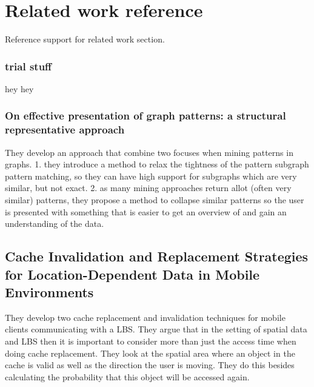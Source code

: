 \section{Related work reference}

Reference support for related work section.



\subsubsection{trial stuff}
hey hey \cite{v2}


\subsubsection{On effective presentation of graph patterns: a structural representative approach}
They develop an approach that combine two focuses when mining patterns in graphs. 1. they introduce a method to relax the tightness of the pattern subgraph pattern matching, so they can have high support for subgraphs which are very similar, but not exact. 2. as many mining approaches return allot (often very similar) patterns, they propose a method to collapse similar patterns so the user is presented with something that is easier to get an overview of and gain an understanding of the data. \cite{napa08}




\subsection{Cache Invalidation and Replacement Strategies for Location-Dependent Data in Mobile Environments}
They develop two cache replacement and invalidation techniques for mobile clients communicating with a LBS. They argue that in the setting of spatial data and LBS then it is important to consider more than just the access time when doing cache replacement. They look at the spatial area where an object in the cache is valid as well as the direction the user is moving. They do this besides calculating the probability that this object will be accessed again.

